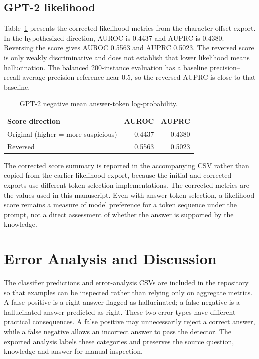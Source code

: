 \documentclass[11pt]{article}
\begin{document}
\subsection{GPT-2 likelihood}
Table~\ref{tab:likelihood} presents the corrected likelihood metrics from the character-offset export. In the hypothesized direction, AUROC is 0.4437 and AUPRC is 0.4380. Reversing the score gives AUROC 0.5563 and AUPRC 0.5023. The reversed score is only weakly discriminative and does not establish that lower likelihood means hallucination. The balanced 200-instance evaluation has a baseline precision--recall average-precision reference near 0.5, so the reversed AUPRC is close to that baseline.
\begin{table}[H]
\centering
\caption{GPT-2 negative mean answer-token log-probability.}
\label{tab:likelihood}
\begin{tabular}{lrr}
\toprule
Score direction & AUROC & AUPRC\\
\midrule
Original (higher = more suspicious) & 0.4437 & 0.4380\\
Reversed & 0.5563 & 0.5023\\
\bottomrule
\end{tabular}
\end{table}

The corrected score summary is reported in the accompanying CSV rather than copied from the earlier likelihood export, because the initial and corrected exports use different token-selection implementations. The corrected metrics are the values used in this manuscript. Even with answer-token selection, a likelihood score remains a measure of model preference for a token sequence under the prompt, not a direct assessment of whether the answer is supported by the knowledge.

\section{Error Analysis and Discussion}
The classifier predictions and error-analysis CSVs are included in the repository so that examples can be inspected rather than relying only on aggregate metrics. A false positive is a right answer flagged as hallucinated; a false negative is a hallucinated answer predicted as right. These two error types have different practical consequences. A false positive may unnecessarily reject a correct answer, while a false negative allows an incorrect answer to pass the detector. The exported analysis labels these categories and preserves the source question, knowledge and answer for manual inspection.
\end{document}
